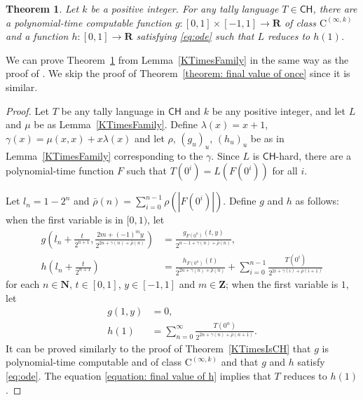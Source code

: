 \documentclass{lmcs}
\newtheorem{theorem}{Theorem}%
\theoremstyle{definition}
\theoremstyle{remark}
\newcommand{\R}{\mathbf R}
\newcommand{\N}{\mathbf N}
\newcommand{\Z}{\mathbf Z}
\newcommand{\classCH}{\mathsf{CH}}
\newcommand{\classC}{\mathrm C}
\begin{document}
\begin{theorem}
\label{theorem: final value of fixed}
Let $k$ be a positive integer. 
For any tally language $T \in \classCH$,
there are a polynomial-time computable function
$g \colon [0,1] \times [-1,1] \to \R$ 
of class $\classC ^{(\infty, k)}$ and 
a function $h \colon [0,1] \to \R$
satisfying \eqref{eq:ode} 
such that $L$ reduces to $h(1)$.
\end{theorem}

We can prove Theorem~\ref{theorem: final value of fixed} 
from Lemma~\ref{KTimesFamily}
in the same way as the proof of \cite[Theorem~5.1]{kawamura2010complexity}.
We skip the proof of Theorem~\ref{theorem: final value of once}
since it is similar.

\begin{proof}
Let $T$ be any tally language in $\classCH$ and $k$ be any positive integer,
and let $L$ and $\mu$ be as Lemma~\ref{KTimesFamily}.
Define $
\lambda(x) = x + 1
$, $
\gamma(x) = \mu(x, x) + x \lambda(x)
$ and let $\rho$, $(g_u)_u$, $(h_u)_u$ be  as in Lemma~\ref{KTimesFamily} 
corresponding to the $\gamma$.
Since $L$ is $\classCH$-hard,
there are a polynomial-time function $F$ such that 
$T (0 ^i) =  L(F(0 ^i))$ for all $i$. 

Let $
l_n = 1 - 2^n
$ and $
\bar{\rho}(n) = \sum^{n-1}_{i = 0} \rho(|F(0 ^i)|)
$.  Define $g$ and $h$ as follows: 
when the first variable is in $[0,1)$, let
\begin{align}
 g \left(l_n + \frac{t}{2^{n+1}}, \frac{2m+(-1)^m y}{2^{2n+\gamma(n)+\bar{\rho}(n)}} \right)
 &=
 \frac{g_{F(0^n)}(t, y)}{2^{n-1+\gamma(n)+\bar{\rho}(n)}},
 \\
 h \left( l_n + \frac{t}{2^{n+1}} \right)
 &=
 \frac{h_{F(0^n)}(t)}{2^{2n+\gamma(n)+\bar{\rho}(n)}}
 + \sum^{n-1}_{i = 0} \frac{T (0^i)}{2^{2 i + \gamma (i) + \bar{\rho} (i + 1)}}
\end{align}
for each $n \in \N$, $t \in [0,1]$, $y \in [-1, 1]$ and $m \in \Z$; 
when the first variable is $1$,
let 
\begin{align} 
  g(1, y) 
&
 =
  0, 
\\
\label{equation: final value of h}
  h(1) 
&
 = 
 \sum^\infty_{n = 0} \frac{T (0^n)}{2^{2n+\gamma(n)+\bar{\rho}(n+1)}}. 
\end{align}
It can be proved similarly to the proof of Theorem~\ref{KTimesIsCH} 
that $g$ is polynomial-time computable and of class $\classC ^{(\infty, k)}$
and that $g$ and $h$ satisfy \eqref{eq:ode}.
The equation \eqref{equation: final value of h} implies 
that $T$ reduces to $h(1)$. 
\end{proof}
\end{document}
